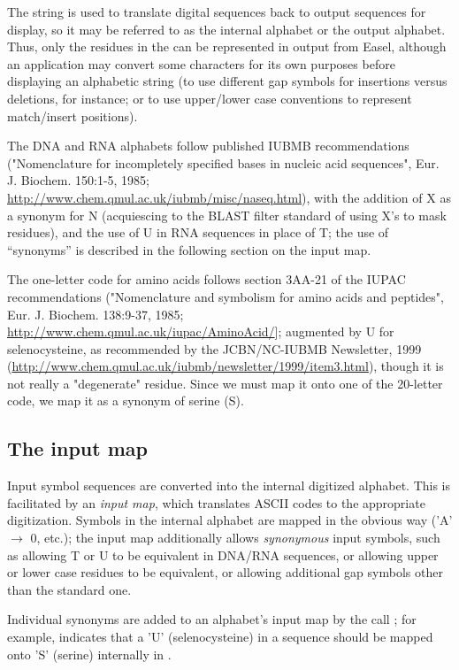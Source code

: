 The  string is used to translate digital sequences back to
output sequences for display, so it may be referred to as the internal
alphabet or the output alphabet.  Thus, only the residues in the
 can be represented in output from Easel, although an
application may convert some characters for its own purposes before
displaying an alphabetic string (to use different gap symbols for
insertions versus deletions, for instance; or to use upper/lower case
conventions to represent match/insert positions).

The DNA and RNA alphabets follow published IUBMB recommendations
("Nomenclature for incompletely specified bases in nucleic acid
sequences", Eur. J. Biochem. 150:1-5, 1985;
\url{http://www.chem.qmul.ac.uk/iubmb/misc/naseq.html}), with the
addition of X as a synonym for N (acquiescing to the BLAST filter
standard of using X's to mask residues), and the use of U in RNA
sequences in place of T; the use of ``synonyms'' is described in the
following section on the input map.

The one-letter code for amino acids follows section 3AA-21 of the
IUPAC recommendations ("Nomenclature and symbolism for amino acids and
peptides", Eur. J. Biochem. 138:9-37, 1985;
\url{http://www.chem.qmul.ac.uk/iupac/AminoAcid/}]; augmented by U for
selenocysteine, as recommended by the JCBN/NC-IUBMB Newsletter, 1999
(\url{http://www.chem.qmul.ac.uk/iubmb/newsletter/1999/item3.html}),
though it is not really a "degenerate" residue. Since we must map it
onto one of the 20-letter code, we map it as a synonym of serine (S).

\subsection{The input map}

Input symbol sequences are converted into the internal digitized
alphabet. This is facilitated by an \emph{input map}, which translates
ASCII codes to the appropriate digitization. Symbols in the internal
alphabet are mapped in the obvious way ('A' $\rightarrow$ 0, etc.);
the input map additionally allows \emph{synonymous} input symbols,
such as allowing T or U to be equivalent in DNA/RNA sequences, or
allowing upper or lower case residues to be equivalent, or allowing
additional gap symbols other than the standard one.

Individual synonyms are added to an alphabet's input map by the call
; for example,
 indicates that a
'U' (selenocysteine) in a sequence should be mapped onto 'S' (serine)
internally in .

